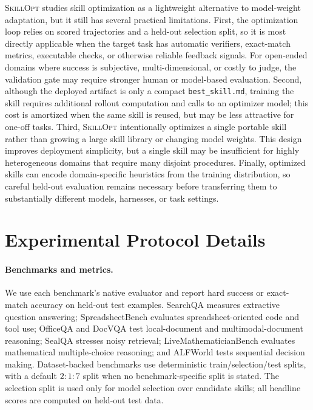 \documentclass{llmxive}
\providecommand{\ourmethod}{\textsc{SkillOpt}\xspace}
\begin{document}
\ourmethod{} studies skill optimization as a lightweight alternative to model-weight adaptation, but it still has several practical limitations. First, the optimization loop relies on scored trajectories and a held-out selection split, so it is most directly applicable when the target task has automatic verifiers, exact-match metrics, executable checks, or otherwise reliable feedback signals. For open-ended domains where success is subjective, multi-dimensional, or costly to judge, the validation gate may require stronger human or model-based evaluation. Second, although the deployed artifact is only a compact \texttt{best\_skill.md}, training the skill requires additional rollout computation and calls to an optimizer model; this cost is amortized when the same skill is reused, but may be less attractive for one-off tasks. Third, \ourmethod{} intentionally optimizes a single portable skill rather than growing a large skill library or changing model weights. This design improves deployment simplicity, but a single skill may be insufficient for highly heterogeneous domains that require many disjoint procedures. Finally, optimized skills can encode domain-specific heuristics from the training distribution, so careful held-out evaluation remains necessary before transferring them to substantially different models, harnesses, or task settings.

\section{Experimental Protocol Details}
\label{app:experimental_setting}

\paragraph{Benchmarks and metrics.}
We use each benchmark's native evaluator and report hard success or exact-match accuracy on held-out test examples. SearchQA measures extractive question answering; SpreadsheetBench evaluates spreadsheet-oriented code and tool use; OfficeQA and DocVQA test local-document and multimodal-document reasoning; SealQA stresses noisy retrieval; LiveMathematicianBench evaluates mathematical multiple-choice reasoning; and ALFWorld tests sequential decision making. Dataset-backed benchmarks use deterministic train/selection/test splits, with a default $2{:}1{:}7$ split when no benchmark-specific split is stated. The selection split is used only for model selection over candidate skills; all headline scores are computed on held-out test data.
\end{document}
